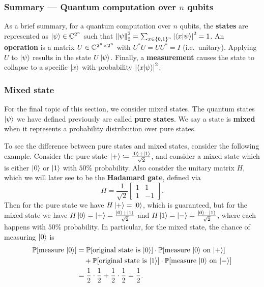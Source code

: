 \documentclass[a4paper,draft]{article}
\begin{document}
\subsubsection*{Summary — Quantum computation over $n$ qubits}

As a brief summary, for a quantum computation over $n$ qubits, the
\textbf{states} are represented as $\left\lvert \psi\right\rangle \in \mathbb{C}^{2^n}$ such that
$\left\lVert \psi\right\rVert_2^2 = \sum_{x \in \{0, 1\}^n} \left\lvert \left\langle x | \psi \right\rangle\right\rvert^2= 1$.
An \textbf{operation} is a matrix $U \in \mathbb{C}^{2^n \times 2^n}$ with $U^* U
= U U^* = I$ (i.e.\ unitary). Applying $U$ to $\left\lvert \psi\right\rangle$ results in the
state $U \left\lvert \psi\right\rangle$. Finally, a \textbf{measurement} causes the state to
collapse to a specific $\left\lvert x\right\rangle$ with probability $\left\lvert \left\langle x |
\psi \right\rangle\right\rvert^2$.

\subsubsection*{Mixed state}

For the final topic of this section, we consider mixed states. The quantum
states $\left\lvert \psi\right\rangle$ we have defined previously are called \textbf{pure
states}. We say a state is \textbf{mixed} when it represents a probability
distribution over pure states.

To see the difference between pure states and mixed states, consider the
following example. Consider the pure state $\left\lvert +\right\rangle \coloneq
\frac{\left\lvert 0\right\rangle + \left\lvert 1\right\rangle}{\sqrt{2}}$, and consider a mixed state which is
either $\left\lvert 0\right\rangle$ or $\left\lvert 1\right\rangle$ with $50\%$ probability. Also consider the
unitary matrix $H$, which we will later see to be the \textbf{Hadamard
gate}, defined via
\[
  H = \frac{1}{\sqrt{2}} \begin{bmatrix}
    1 & 1  \\
    1 & -1
  \end{bmatrix}.
\]
Then for the pure state we have $H \left\lvert +\right\rangle = \left\lvert 0\right\rangle $, which is
  guaranteed, but for the mixed state we have $H \left\lvert 0\right\rangle = \left\lvert +\right\rangle=
  \frac{\left\lvert 0\right\rangle + \left\lvert 1\right\rangle}{\sqrt{2}}$ and $H \left\lvert 1\right\rangle = \left\lvert -\right\rangle =
  \frac{\left\lvert 0\right\rangle - \left\lvert 1\right\rangle}{\sqrt{2}}$, where each happens with $50\%$
  probability. In particular, for the mixed state, the chance of measuring
  $\left\lvert 0\right\rangle$ is
\begin{align*}
  \mathbb{P} [\text{measure $\left\lvert 0\right\rangle$}]
   & = \mathbb{P} [\text{original state is $\left\lvert 0\right\rangle$}]
  \cdot \mathbb{P} [\text{measure $\left\lvert 0\right\rangle$ on $\left\lvert +\right\rangle$}]  \\
   & \quad + \mathbb{P} [\text{original state is $\left\lvert 1\right\rangle$}]
  \cdot \mathbb{P} [\text{measure $\left\lvert 0\right\rangle$ on $\left\lvert -\right\rangle$}]  \\
   & = \frac{1}{2} \cdot \frac{1}{2} +
  \frac{1}{2} \cdot \frac{1}{2} = \frac{1}{2}.
\end{align*}
\end{document}
